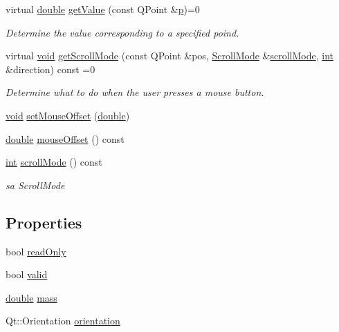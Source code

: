 \begin{DoxyCompactItemize}
\item 
virtual \hyperlink{_super_l_u_support_8h_a8956b2b9f49bf918deed98379d159ca7}{double} \hyperlink{class_qwt_abstract_slider_a6e26a993536813c2d9846a28f3c27aa7}{get\-Value} (const Q\-Point \&\hyperlink{glext_8h_aa5367c14d90f462230c2611b81b41d23}{p})=0
\begin{DoxyCompactList}\small\item\em Determine the value corresponding to a specified poind. \end{DoxyCompactList}\item 
virtual \hyperlink{group___u_a_v_objects_plugin_ga444cf2ff3f0ecbe028adce838d373f5c}{void} \hyperlink{class_qwt_abstract_slider_a4124aa3b1e462d57ea2693214e66da0b}{get\-Scroll\-Mode} (const Q\-Point \&pos, \hyperlink{class_qwt_abstract_slider_ae4c0c4844ac6a35356f3c529a8eae154}{Scroll\-Mode} \&\hyperlink{class_qwt_abstract_slider_a4a1b9e022180a8567f09632388002396}{scroll\-Mode}, \hyperlink{ioapi_8h_a787fa3cf048117ba7123753c1e74fcd6}{int} \&direction) const =0
\begin{DoxyCompactList}\small\item\em Determine what to do when the user presses a mouse button. \end{DoxyCompactList}\item 
\hyperlink{group___u_a_v_objects_plugin_ga444cf2ff3f0ecbe028adce838d373f5c}{void} \hyperlink{class_qwt_abstract_slider_a120e5a03094ef0baf793000972a21722}{set\-Mouse\-Offset} (\hyperlink{_super_l_u_support_8h_a8956b2b9f49bf918deed98379d159ca7}{double})
\item 
\hyperlink{_super_l_u_support_8h_a8956b2b9f49bf918deed98379d159ca7}{double} \hyperlink{class_qwt_abstract_slider_a138397a755057932b5da72f526fc74e6}{mouse\-Offset} () const 
\item 
\hyperlink{ioapi_8h_a787fa3cf048117ba7123753c1e74fcd6}{int} \hyperlink{class_qwt_abstract_slider_a4a1b9e022180a8567f09632388002396}{scroll\-Mode} () const 
\begin{DoxyCompactList}\small\item\em sa Scroll\-Mode \end{DoxyCompactList}\end{DoxyCompactItemize}
\subsection*{Properties}
\begin{DoxyCompactItemize}
\item 
bool \hyperlink{class_qwt_abstract_slider_ad7074d3448c265bcb4d9c317b38812be}{read\-Only}
\item 
bool \hyperlink{class_qwt_abstract_slider_a65a589ff3bbfdeb3b5f099bbf7c5e45a}{valid}
\item 
\hyperlink{_super_l_u_support_8h_a8956b2b9f49bf918deed98379d159ca7}{double} \hyperlink{class_qwt_abstract_slider_aa22d54902fff272ceaedb6ebed8451b1}{mass}
\item 
Qt\-::\-Orientation \hyperlink{class_qwt_abstract_slider_ac6a51cf8c6e298be121c7bab1fdb4376}{orientation}
\end{DoxyCompactItemize}


